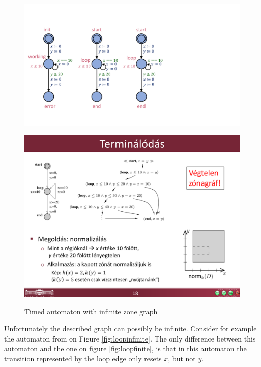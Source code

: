 \begin{figure}
	\centering
	\begin{minipage}[c] {0.25\linewidth}%
		\includegraphics [width=\textwidth]{include/figures/loop_example_original}%
		\label{fig:loopinfinite}
	\end{minipage}%
	\begin{minipage}[c] {0.7\linewidth}%
		\includegraphics [width=\textwidth] {include/figures/loop_original_zonegraph}%
		\label{fig:loopinfinitegraph}
	\end{minipage}
	\caption{Timed automaton with infinite zone graph}
\end{figure} 

Unfortunately the described graph can possibly be infinite. Consider for example the automaton from \cite{bengtsson2004timed} on Figure \ref{fig:loopinfinite}. The only difference between this automaton and the one on figure \ref{fig:loopfinite}, is that in this automaton the transition represented by the loop edge only resets $x$, but not $y$.

